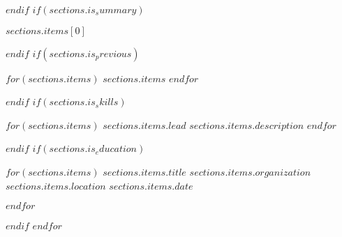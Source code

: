 \documentclass[11pt, a4paper]{templates/template}
\begin{document}
$endif$
$if(sections.is_summary)$
\begin{cvparagraph}

{$sections.items[0]$}
\end{cvparagraph}
$endif$
$if(sections.is_previous)$
\begin{cvskills}
    $for(sections.items)$
    \cvskill
        {\bullet}{$sections.items$}%
    $endfor$
\end{cvskills}
$endif$
$if(sections.is_skills)$
\begin{cvskills}
    $for(sections.items)$
    \cvskill
        {$sections.items.lead$} %
        {$sections.items.description$} %
    $endfor$
\end{cvskills}
$endif$
$if(sections.is_education)$
\begin{cventries}
    $for(sections.items)$
    \cventry
        {$sections.items.title$} %
        {$sections.items.organization$} %
        {$sections.items.location$} %
        {$sections.items.date$} %
        {
        \begin{cvitems} %
        \end{cvitems}
        }
    $endfor$
\end{cventries}
$endif$
$endfor$
\end{document}
